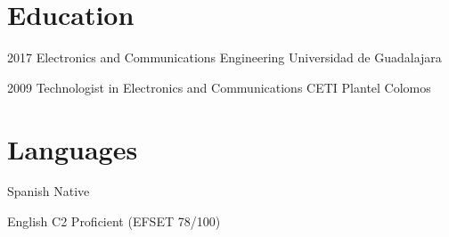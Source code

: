 \documentclass[10pt, letterpaper]{article} %
\begin{document}

\section{Education}

\dateitem
{2017}
{Electronics and Communications Engineering}
{Universidad de Guadalajara}


\dateitem
{2009}
{Technologist in Electronics and Communications}
{CETI Plantel Colomos}


\section{Languages}

\langitem
{Spanish}
{Native}

\langitem
{English}
{C2 Proficient (EFSET 78/100)}

\end{document}
